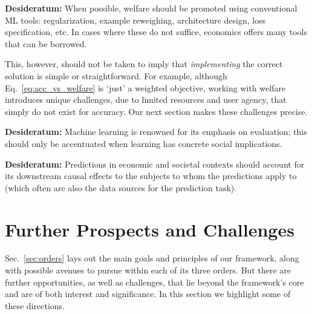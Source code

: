 {\bbox
\textbf{Desideratum:} 
When possible, welfare should be promoted 
using conventional ML tools:
regularization,
example reweighing,
architecture design, 
loss specification, etc.
In cases where these do not suffice,
economics offers many tools that can be borrowed.
\ebox

This, however, should not be taken to imply that \emph{implementing} the correct solution is simple or straightforward.
For example, although Eq.~\eqref{eq:acc_vs_welfare} is `just' a weighted objective,
working with welfare introduces unique challenges,
due to limited resources and user agency,
that simply do not exist for accuracy.
Our next section makes these challenges precise.
\squeeze



\bbox
\textbf{Desideratum:} Machine learning is renowned for its emphasis on evaluation; this should only be accentuated
when learning has concrete social implications.
\ebox




\bbox
\textbf{Desideratum:}
Predictions in economic and societal contexts should account for its downstream causal effects to the subjects to whom the predictions apply to (which   often are also the data sources for the prediction task). 
\ebox
}



\section{Further Prospects and Challenges} \label{appx:beyond}
Sec.~\ref{sec:orders} lays out the main goals and principles of 
our framework,
along with possible avenues to pursue within each of its three orders.
But there are further opportunities, as well as challenges,
that lie beyond the framework's core and
are of both interest and significance.
In this section we highlight some of these directions.

